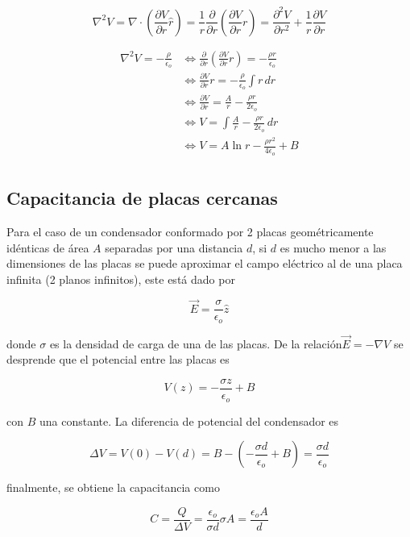 \[\nabla^2V =
\nabla\cdot\left(\frac{\partial V}{\partial r}\hat{r}\right) =
\frac{1}{r}\frac{\partial}{\partial r}\left(\frac{\partial V}{\partial r}r\right) =
\frac{\partial^2 V}{\partial r^2}+\frac{1}{r}\frac{\partial V}{\partial r}
\]

\begin{equation}
\begin{split}
\nabla^2V = -\frac{\rho}{\epsilon_o} & \Leftrightarrow
\frac{\partial}{\partial r}\left(\frac{\partial V}{\partial r}r\right) = -\frac{\rho r}{\epsilon_o}
\\
& \Leftrightarrow \frac{\partial V}{\partial r}r =
-\frac{\rho}{\epsilon_o}\int r\,dr
\\
& \Leftrightarrow \frac{\partial V}{\partial r} =
\frac{A}{r} - \frac{\rho r}{2\epsilon_o}
\\
& \Leftrightarrow V =
\int\frac{A}{r} - \frac{\rho r}{2\epsilon_o}\,dr
\\
& \Leftrightarrow V = 
A\ln{r} - \frac{\rho r^2}{4\epsilon_o} + B
\\
\end{split}
\nonumber
\end{equation}

\subsection{Capacitancia de placas cercanas}
\label{C:placas}
Para el caso de un condensador conformado por 2 placas geométricamente idénticas de área $A$ separadas por una distancia $d$, si $d$ es mucho menor a las dimensiones de las placas se puede aproximar el campo eléctrico al de una placa infinita (2 planos infinitos), este está dado por

\[\Vec{E}=\frac{\sigma}{\epsilon_o}\hat{z}\]

donde $\sigma$ es la densidad de carga de una de las placas. De la relación\newline $\Vec{E}=-\nabla V$ se desprende que el potencial entre las placas es

\[V(z) = -\frac{\sigma z}{\epsilon_o}+B\]

con $B$ una constante. La diferencia de potencial del condensador es

\[\Delta V=V(0)-V(d)=B-
\left(-\frac{\sigma d}{\epsilon_o}+B\right) =
\frac{\sigma d}{\epsilon_o}\]

finalmente, se obtiene la capacitancia como

\[C=\frac{Q}{\Delta V}=\frac{\epsilon_o}{\sigma d}\sigma A=
\frac{\epsilon_o A}{d}\]


